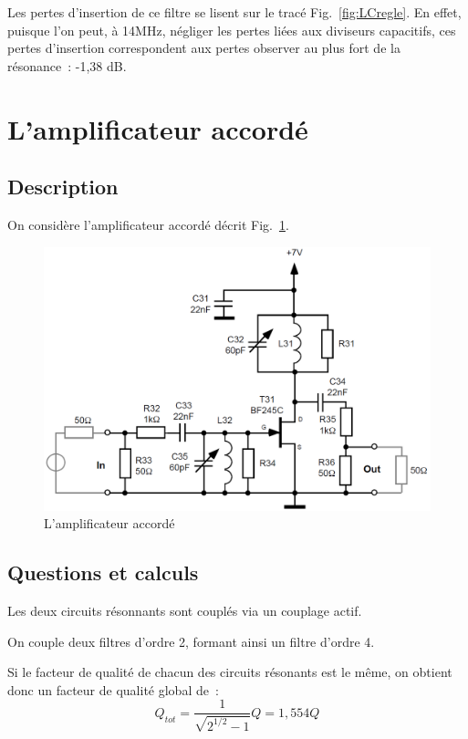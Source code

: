 \documentclass{article}
\begin{document}

Les pertes d'insertion de ce filtre se lisent sur le tracé Fig.~\ref{fig:LCregle}. En effet, puisque l'on peut, à 14MHz, négliger les pertes liées aux diviseurs capacitifs, ces pertes d'insertion correspondent aux pertes observer au plus fort de la résonance~: -1,38 dB.








\section{L'amplificateur accordé}

\subsection{Description}

On considère l'amplificateur accordé décrit Fig.~\ref{schem6}.

\begin{figure}[h!]
	\centering
	\includegraphics[width=.7\textwidth]{schem6}
	\caption{L'amplificateur accordé}
	\label{schem6}
\end{figure}


\subsection{Questions et calculs}


Les deux circuits résonnants sont couplés via un couplage actif.


On couple deux filtres d'ordre 2, formant ainsi un filtre d'ordre 4.

Si le facteur de qualité de chacun des circuits résonants est le même, on obtient donc un facteur de qualité global de~:
\begin{equation*}
Q_{tot} = \frac{1}{\sqrt{2^{1/2}-1}}Q = 1,554 Q
\end{equation*}
\end{document}
